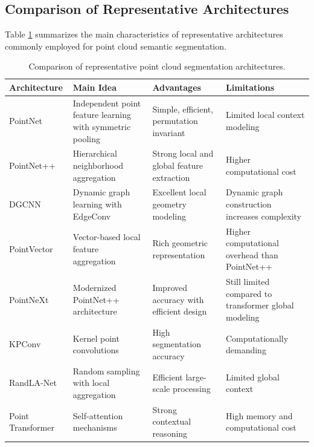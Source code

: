 \subsection{Comparison of Representative Architectures}

Table \ref{tab:architecture_comparison} summarizes the main characteristics of representative architectures commonly employed for point cloud semantic segmentation.

\begin{table}[H]
\centering
\caption{Comparison of representative point cloud segmentation architectures.}
\label{tab:architecture_comparison}
\begin{tabular}{|l|p{3.2cm}|p{3.3cm}|p{3.2cm}|}
\hline
\textbf{Architecture} & \textbf{Main Idea} & \textbf{Advantages} & \textbf{Limitations} \\
\hline
PointNet \cite{Qi2017PointNet} & Independent point feature learning with symmetric pooling & Simple, efficient, permutation invariant & Limited local context modeling \\
\hline
PointNet++ \cite{Qi2017PointNetPP} & Hierarchical neighborhood aggregation & Strong local and global feature extraction & Higher computational cost \\
\hline
DGCNN \cite{Wang2019DGCNN} & Dynamic graph learning with EdgeConv & Excellent local geometry modeling & Dynamic graph construction increases complexity \\
\hline
PointVector \cite{PointVector} & Vector-based local feature aggregation & Rich geometric representation & Higher computational overhead than PointNet++ \\
\hline
PointNeXt \cite{PointNeXt} & Modernized PointNet++ architecture & Improved accuracy with efficient design & Still limited compared to transformer global modeling \\
\hline
KPConv \cite{Thomas2019KPConv} & Kernel point convolutions & High segmentation accuracy & Computationally demanding \\
\hline
RandLA-Net \cite{Hu2020RandLANet} & Random sampling with local aggregation & Efficient large-scale processing & Limited global context \\
\hline
Point Transformer \cite{Zhao2021PointTransformer} & Self-attention mechanisms & Strong contextual reasoning & High memory and computational cost \\
\hline
\end{tabular}
\end{table}

